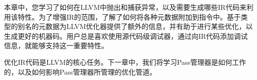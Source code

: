 本章中，您学习了如何在LLVM中抛出和捕获异常，以及需要生成哪些IR代码来利用该特性。为了增强IR的范围，了解了如何将各种元数据附加到指令中。基于类型的别名的元数据为LLVM优化器提供了额外的信息，并有助于进行某些优化，以生成更好的机器码。用户总是喜欢使用源代码级调试器，通过向IR代码添加调试信息，就能够支持这一重要特性。\par

优化IR代码是LLVM的核心任务。下一章中，我们将学习Pass管理器是如何工作的，以及如何影响Pass管理器所管理的优化管道。\par

\newpage